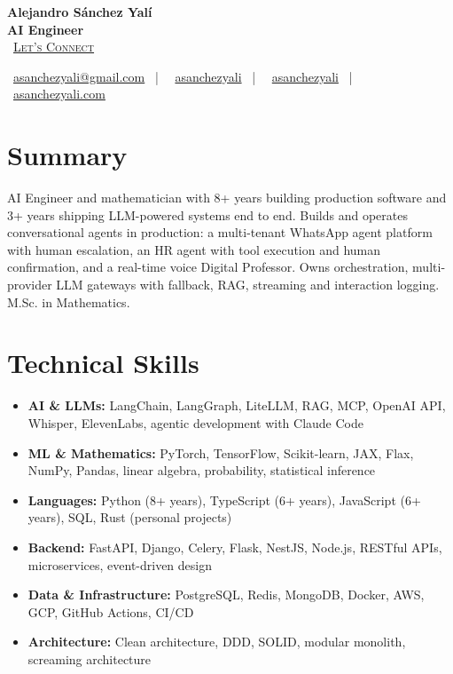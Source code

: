 \documentclass[letterpaper,10pt]{article}
\newcommand{\normalfaCalendar}{{\mdseries\faCalendar}}
\newcommand{\normalfaEnvelope}{{\mdseries\faEnvelope}}
\newcommand{\normalfaLinkedin}{{\mdseries\faLinkedin}}
\newcommand{\normalfaGithub}{{\mdseries\faGithub}}
\newcommand{\normalfaGlobe}{{\mdseries\faGlobe}}
\begin{document}
\begin{center}
\textbf{\LARGE Alejandro S\'anchez Yal\'i}\\[0.2em]
\textbf{\Large AI Engineer}\\[0.4em]
\small
\normalfaCalendar\ \href{https://cal.com/asanchezyali/full-time-opportunities}{\textsc{Let's Connect}}

\vspace{0.5em}
\normalfaEnvelope\ \href{mailto:asanchezyali@gmail.com}{asanchezyali@gmail.com}  ~|~
\normalfaLinkedin\ \href{https://www.linkedin.com/in/asanchezyali}{asanchezyali} ~|~
\normalfaGithub\ \href{https://github.com/asanchezyali}{asanchezyali}  ~|~
\normalfaGlobe\ \href{https://asanchezyali.com}{asanchezyali.com}
\end{center}


\section{Summary}
AI Engineer and mathematician with 8+ years building production software and 3+ years shipping LLM-powered systems end to end. Builds and operates conversational agents in production: a multi-tenant WhatsApp agent platform with human escalation, an HR agent with tool execution and human confirmation, and a real-time voice Digital Professor. Owns orchestration, multi-provider LLM gateways with fallback, RAG, streaming and interaction logging. M.Sc. in Mathematics.

\section{Technical Skills}
\begin{itemize}[leftmargin=*, itemsep=0pt]
  \item \textbf{AI \& LLMs:} LangChain, LangGraph, LiteLLM, RAG, MCP, OpenAI API, Whisper, ElevenLabs, agentic development with Claude Code
  \item \textbf{ML \& Mathematics:} PyTorch, TensorFlow, Scikit-learn, JAX, Flax, NumPy, Pandas, linear algebra, probability, statistical inference
  \item \textbf{Languages:} Python (8+ years), TypeScript (6+ years), JavaScript (6+ years), SQL, Rust (personal projects)
  \item \textbf{Backend:} FastAPI, Django, Celery, Flask, NestJS, Node.js, RESTful APIs, microservices, event-driven design
  \item \textbf{Data \& Infrastructure:} PostgreSQL, Redis, MongoDB, Docker, AWS, GCP, GitHub Actions, CI/CD
  \item \textbf{Architecture:} Clean architecture, DDD, SOLID, modular monolith, screaming architecture
\end{itemize}
\end{document}
